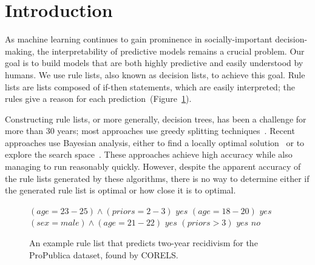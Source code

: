 %
%
%
%
%
%

\section{Introduction}

As machine learning continues to gain prominence in socially-important decision-making,
the interpretability of predictive models remains a crucial problem.
%
Our goal is to build models that are both highly predictive and easily understood by humans.
%
We use rule lists, also known as decision lists, to achieve this goal.
%
Rule lists are lists composed of if-then statements, which are easily interpreted; the rules give a reason for each prediction~(Figure~\ref{fig:rule-list}).

Constructing rule lists, or more generally, decision trees, has been a challenge for more than
30 years; most approaches use greedy splitting techniques~\cite{Rivest87,Breiman84,Quinlan93}. 
%
Recent approaches use Bayesian analysis, either to find a locally optimal solution~\cite{Chipman:1998jh} or to explore the search space~\citep{LethamRuMcMa15, YangRuSe16}.
%
These approaches achieve high accuracy while also managing to run reasonably quickly. However, despite the apparent accuracy of the rule lists generated by these algorithms, there is no way to determine either if the generated rule list is optimal or how close it is to optimal.

\begin{arxiv}
\begin{figure}[t!]
\begin{algorithmic}
\State \bif $(age=23-25) \wedge (priors=2-3)$ \bthen $yes$
\State \belif $(age=18-20)$ \bthen $yes$
\State \belif $(sex=male) \wedge (age=21-22)$ \bthen $yes$
\State \belif $(priors>3)$ \bthen $yes$
\State \belse $no$
\end{algorithmic}
\caption{An example rule list that predicts two-year recidivism
for the ProPublica dataset, found by CORELS.
}
\label{fig:rule-list}
\end{figure}
\end{arxiv}

